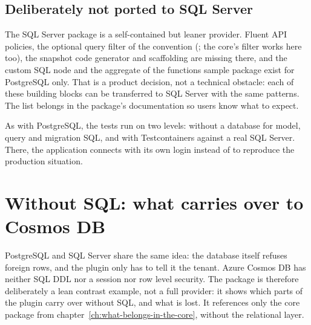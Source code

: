 \section{Deliberately not ported to SQL Server}

The SQL Server package is a self-contained but leaner provider. Fluent API policies, the optional
query filter of the convention (; the core's
filter works here too), the snapshot code generator and scaffolding are missing there, and the custom
SQL node and the aggregate of the functions sample package exist for PostgreSQL only.
That is a product decision, not a technical obstacle: each of these building blocks
can be transferred to SQL Server with the same patterns. The list belongs in the package's
documentation so users know what to expect.


As with PostgreSQL, the tests run on two levels: without a database for model, query and
migration SQL, and with Testcontainers against a real SQL Server. There, the application
connects with its own login instead of  to reproduce the production situation.

\chapter{Without SQL: what carries over to Cosmos DB}\label{ch:without-sql-what-carries-over}

PostgreSQL and SQL Server share the same idea: the database itself refuses foreign rows, and
the plugin only has to tell it the tenant. Azure Cosmos DB has neither SQL DDL nor a session
nor row level security. The package
is therefore deliberately a lean contrast example, not a full provider: it shows which parts of
the plugin carry over without SQL, and what is lost. It references only the core package from
chapter~\ref{ch:what-belongs-in-the-core}, without the relational layer.

